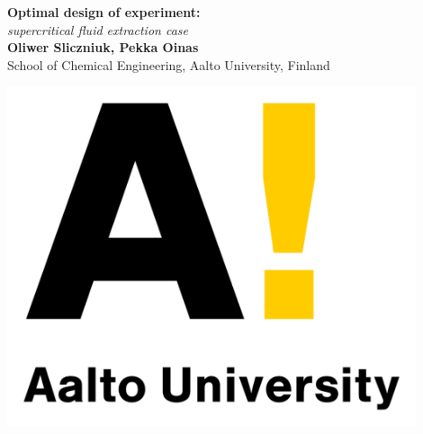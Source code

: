 \documentclass[a0,portrait]{a0poster}
\begin{document}
\pagecolor{white!90!black}


\begin{minipage}[b]{0.75\linewidth}
\veryHuge \color{NavyBlue} \textbf{Optimal design of experiment:} \color{Black}\\ %
\Huge\textit{supercritical fluid extraction case}\\[1cm] %
\huge \textbf{Oliwer Sliczniuk, Pekka Oinas}\\%
\huge School of Chemical Engineering, Aalto University, Finland\\[0.4cm] %
\end{minipage}
%
\begin{minipage}[b]{0.25\linewidth}
\includegraphics[width=12cm]{Aalto_University_logo.png}\\ \\
\end{minipage}
\end{document}
